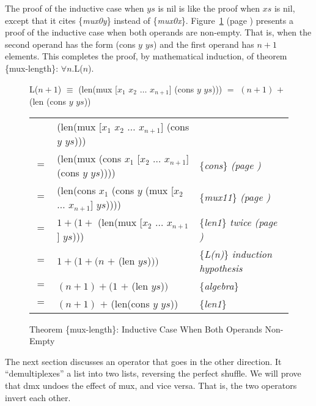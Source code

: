 The proof of the inductive case when $ys$ is \textsf{nil}
is like the proof when $xs$ is \textsf{nil},
except that it cites \{\emph{mux0y}\} instead of \{\emph{mux0x}\}.
Figure~\ref{fig:prf-mux-len-induc} (page \pageref{fig:prf-mux-len-induc})
presents a proof  of the inductive case when both operands are non-empty.
That is, when the second operand has the form \textsf{(cons $y$ $ys$)}
and the first operand has $n+1$ elements.
This completes the proof, by mathematical induction, of
theorem \{mux-length\}: $\forall n.$L($n$).

\begin{figure}
\begin{center}
L($n+1$) $\equiv$ \textsf{(len(mux [$x_1$ $x_2$ $\dots$ $x_{n+1}$] (cons $y$ $ys$))) $=$ $(n+1)$ $+$ (len (cons $y$ $ys$))}

\begin{tabular}{lll}
    & \textsf{(len(mux [$x_1$ $x_2$ $\dots$ $x_{n+1}$] (cons $y$ $ys$)))}        &   \\
$=$ & \textsf{(len(mux (cons $x_1$ [$x_2$ $\dots$ $x_{n+1}$] (cons $y$ $ys$))))} & \{\emph{cons}\} \emph{(page \pageref{first-rest-cons})} \\
$=$ & \textsf{(len(cons $x_1$ (cons $y$ (mux [$x_2$ $\dots$ $x_{n+1}$] $ys$))))} & \{\emph{mux11}\} \emph{(page \pageref{axioms:mux})}\\
$=$ & $1 + (1 +$ \textsf{(len(mux [$x_2$ $\dots$ $x_{n+1}$] $ys$))})             & \{\emph{len1}\} \emph{twice (page \pageref{len-equations})}\\
$=$ & $1 + (1 + (n$ $+$ \textsf{(len $ys$)}$))$                                  & \{\emph{L(n)}\} \emph{induction hypothesis} \\
$=$ & $(n + 1) + (1$ $+$ \textsf{(len $ys$)}$)$                                  & \{\emph{algebra}\} \\
$=$ & $(n + 1)$ $+$ \textsf{(len(cons $y$ $ys$))}                                & \{\emph{len1}\} \\
\end{tabular}
\end{center}
\caption{Theorem \{mux-length\}: Inductive Case When Both Operands Non-Empty}
\label{fig:prf-mux-len-induc}
\end{figure}

The next section discusses an operator that goes in the other direction.
It ``demultiplexes'' a list into two lists, reversing the perfect shuffle.
We will prove that \textsf{dmx} undoes the effect of \textsf{mux}, and vice versa.
That is, the two operators invert each other.

